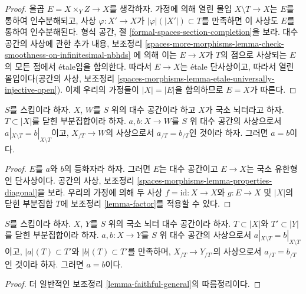 \begin{proof}
올곱 $E = X \times_Y Z \to X$를 생각하자. 가정에 의해 열린 몰입
$X \setminus T \to X$는 $E$를 통하여 인수분해되고, 사상
$\varphi : X' \to X$가 $|\varphi|(|X'|) \subset T$를 만족하면
이 사상도 $E$를 통하여 인수분해된다. 형식 공간, 절
\ref{formal-spaces-section-completion}을 보라.
대수 공간의 사상에 관한 추가 내용, 보조정리
\ref{spaces-more-morphisms-lemma-check-smoothness-on-infinitesimal-nbhds}
에 의해 이는 $E \to X$가 $T$의 점으로 사상되는 $E$의 모든 점에서
\'etale임을 함의한다. 따라서 $E \to X$는 \'etale 단사상이고,
따라서 열린 몰입이다(공간의 사상, 보조정리
\ref{spaces-morphisms-lemma-etale-universally-injective-open}).
이제 우리의 가정들이 $|X| = |E|$을 함의하므로 $E = X$가 따른다.
\end{proof}

\begin{lemma}
\label{lemma-faithful-general}
$S$를 스킴이라 하자. $X$, $W$를 $S$ 위의 대수 공간이라 하고
$X$가 국소 뇌터라고 하자. $T \subset |X|$를 닫힌 부분집합이라 하자.
$a, b : X \to W$를 $S$ 위 대수 공간의 사상으로서
$a|_{X \setminus T} = b|_{X \setminus T}$이고,
$X_{/T} \to W$의 사상으로서 $a_{/T} = b_{/T}$인 것이라 하자.
그러면 $a = b$이다.
\end{lemma}

\begin{proof}
$E$를 $a$와 $b$의 등화자라 하자. 그러면 $E$는 대수 공간이고
$E \to X$는 국소 유한형인 단사상이다. 공간의 사상, 보조정리
\ref{spaces-morphisms-lemma-properties-diagonal}을 보라.
우리의 가정에 의해 두 사상
$f = \text{id} : X \to X$와 $g : E \to X$ 및
$|X|$의 닫힌 부분집합 $T$에 보조정리 \ref{lemma-factor}를 적용할 수 있다.
\end{proof}

\begin{lemma}
\label{lemma-faithful}
$S$를 스킴이라 하자. $X$, $Y$를 $S$ 위의 국소 뇌터 대수 공간이라 하자.
$T \subset |X|$와 $T' \subset |Y|$를 닫힌 부분집합이라 하자.
$a, b : X \to Y$를 $S$ 위 대수 공간의 사상으로서
$a|_{X \setminus T} = b|_{X \setminus T}$이고,
$|a|(T) \subset T'$와 $|b|(T) \subset T'$를 만족하며,
$X_{/T} \to Y_{/T'}$의 사상으로서 $a_{/T} = b_{/T}$인 것이라 하자.
그러면 $a = b$이다.
\end{lemma}

\begin{proof}
더 일반적인 보조정리 \ref{lemma-faithful-general}의 따름정리이다.
\end{proof}

